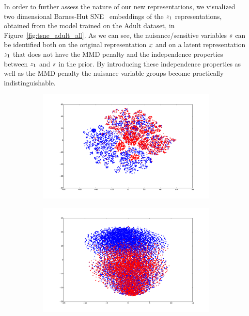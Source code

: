 In order to further assess the nature of our new representations, we visualized two dimensional Barnes-Hut SNE~\citep{2013arXiv1301.3342V} embeddings of the $\*z_1$ representations, obtained from the model trained on the Adult dataset, in Figure~\ref{fig:tsne_adult_all}. As we can see, the nuisance/sensitive variables $\*s$ can be identified both on the original representation $\*x$ and on a latent representation $\*z_1$ that does not have the MMD penalty and the independence properties between $\*z_1$ and $\*s$ in the prior. By introducing these independence properties as well as the MMD penalty the nuisance variable groups become practically indistinguishable.

\begin{figure}[h]
  \centering
  \begin{subfigure}{.25\textwidth}
        \centering
        \includegraphics[width=1.\textwidth]{tsne_adult_x.pdf}
        \caption{}
        \label{fig:tsne_adult_x}
    \end{subfigure}%
    \begin{subfigure}{.25\textwidth}
        \centering
        \includegraphics[width=1.\textwidth]{tsne_adult.pdf}

\end{subfigure}
\end{figure}
